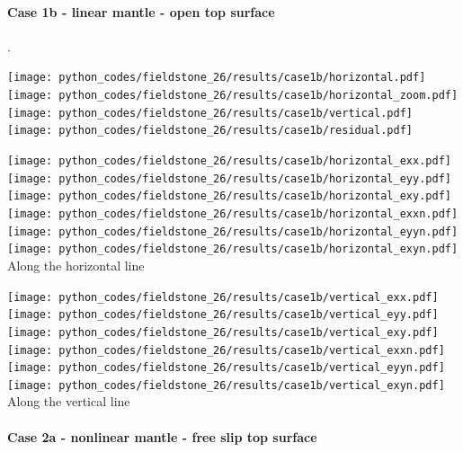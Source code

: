 \newpage
\paragraph{Case 1b - linear mantle - open top surface} . 


\begin{center}
\texttt{[image: python\_codes/fieldstone\_26/results/case1b/horizontal.pdf]}
\texttt{[image: python\_codes/fieldstone\_26/results/case1b/horizontal\_zoom.pdf]}\\
\texttt{[image: python\_codes/fieldstone\_26/results/case1b/vertical.pdf]}
\texttt{[image: python\_codes/fieldstone\_26/results/case1b/residual.pdf]}
\end{center}

\begin{center}
\texttt{[image: python\_codes/fieldstone\_26/results/case1b/horizontal\_exx.pdf]}
\texttt{[image: python\_codes/fieldstone\_26/results/case1b/horizontal\_eyy.pdf]}
\texttt{[image: python\_codes/fieldstone\_26/results/case1b/horizontal\_exy.pdf]}\\
\texttt{[image: python\_codes/fieldstone\_26/results/case1b/horizontal\_exxn.pdf]}
\texttt{[image: python\_codes/fieldstone\_26/results/case1b/horizontal\_eyyn.pdf]}
\texttt{[image: python\_codes/fieldstone\_26/results/case1b/horizontal\_exyn.pdf]}\\
{\captionfont Along the horizontal line}
\end{center}

\begin{center}
\texttt{[image: python\_codes/fieldstone\_26/results/case1b/vertical\_exx.pdf]}
\texttt{[image: python\_codes/fieldstone\_26/results/case1b/vertical\_eyy.pdf]}
\texttt{[image: python\_codes/fieldstone\_26/results/case1b/vertical\_exy.pdf]}\\
\texttt{[image: python\_codes/fieldstone\_26/results/case1b/vertical\_exxn.pdf]}
\texttt{[image: python\_codes/fieldstone\_26/results/case1b/vertical\_eyyn.pdf]}
\texttt{[image: python\_codes/fieldstone\_26/results/case1b/vertical\_exyn.pdf]}\\
{\captionfont Along the vertical line}
\end{center}

\newpage
\paragraph{Case 2a - nonlinear mantle - free slip top surface} 

